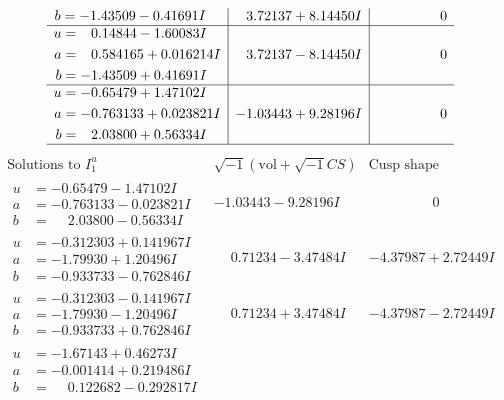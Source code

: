\documentclass[1p]{elsarticle_modified}
\theoremstyle{definition}
\newcommand{\I}{\sqrt{-1}}
\begin{document}
$$\begin{array}{c|c|c}
\begin{aligned}
b &= -1.43509 - 0.41691 I\end{aligned}
 & \phantom{-}3.72137 + 8.14450 I & \phantom{-0.000000 } 0 \\ \hline\begin{aligned}
u &= \phantom{-}0.14844 - 1.60083 I \\
a &= \phantom{-}0.584165 + 0.016214 I \\
b &= -1.43509 + 0.41691 I\end{aligned}
 & \phantom{-}3.72137 - 8.14450 I & \phantom{-0.000000 } 0 \\ \hline\begin{aligned}
u &= -0.65479 + 1.47102 I \\
a &= -0.763133 + 0.023821 I \\
b &= \phantom{-}2.03800 + 0.56334 I\end{aligned}
 & -1.03443 + 9.28196 I & \phantom{-0.000000 } 0\\
 \hline 
 \end{array}$$\newpage$$\begin{array}{c|c|c}  
\text{Solutions to }I^u_{1}& \I (\text{vol} + \sqrt{-1}CS) & \text{Cusp shape}\\
 \hline 
\begin{aligned}
u &= -0.65479 - 1.47102 I \\
a &= -0.763133 - 0.023821 I \\
b &= \phantom{-}2.03800 - 0.56334 I\end{aligned}
 & -1.03443 - 9.28196 I & \phantom{-0.000000 } 0 \\ \hline\begin{aligned}
u &= -0.312303 + 0.141967 I \\
a &= -1.79930 + 1.20496 I \\
b &= -0.933733 - 0.762846 I\end{aligned}
 & \phantom{-}0.71234 - 3.47484 I & -4.37987 + 2.72449 I \\ \hline\begin{aligned}
u &= -0.312303 - 0.141967 I \\
a &= -1.79930 - 1.20496 I \\
b &= -0.933733 + 0.762846 I\end{aligned}
 & \phantom{-}0.71234 + 3.47484 I & -4.37987 - 2.72449 I \\ \hline\begin{aligned}
u &= -1.67143 + 0.46273 I \\
a &= -0.001414 + 0.219486 I \\
b &= \phantom{-}0.122682 - 0.292817 I\end{aligned}

\end{array}$$
\end{document}
